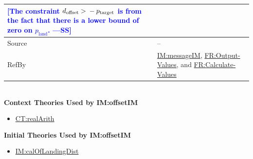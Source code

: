 \documentclass[12pt]{article}
\newcommand{\authornote}[3]{\textcolor{#1}{[#3 ---#2]}}
\newcommand{\authornote}[3]{}
\newcommand{\wss}[1]{\authornote{blue}{SS}{#1}}
\newcommand{\gt}{\ensuremath >}
\begin{document}
\begin{minipage}{\textwidth}
\begin{tabular}{>{\raggedright}p{}>{\raggedright\arraybackslash}p{}}
        \wss{The constraint ${d_{\text{offset}}}\gt{}-{p_{\text{target}}}$ is from the fact that there is a lower bound of zero on ${p_{\text{land}}}$.}
        
\\ \midrule
Source & --
         
\\ \midrule
RefBy & \hyperref[IM:messageIM]{IM:messageIM}, \hyperref[outputValues]{FR:Output-Values}, and \hyperref[calcValues]{FR:Calculate-Values}
        
\\ \bottomrule
\end{tabular}
\end{minipage}
~\\

\noindent \textbf{Context Theories Used by IM:offsetIM}

\begin{itemize}
\item \hyperref[CT:realArith]{CT:realArith}
\end{itemize}

\noindent \textbf{Initial Theories Used by IM:offsetIM}

\begin{itemize}
\item \hyperref[IM:calOfLandingDist]{IM:calOfLandingDist}
\end{itemize}
\end{document}
